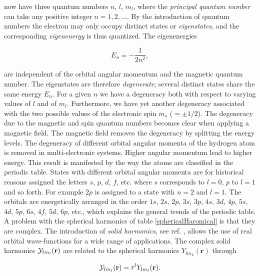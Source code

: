 now have three quantum numbers $n$, $l$, $m_l$, where the
\emph{principal quantum number} can take any positive integer
$n=1,2,\dots$. By the introduction of 
quantum numbers the electron may only occupy distinct states or
\emph{eigenstates}, and the corresponding \emph{eigenenergy} is thus
quantized. The eigenenergies

\begin{equation*}
  E_{n} = -\frac{1}{2n^2},
\end{equation*}

are independent of the orbital angular momentum and the magnetic
quantum number. The eigenstates are therefore \emph{degenerate};
several distinct states share the same energy $E_n$. For a given $n$
we have a degeneracy both with respect to varying values of $l$ and of
$m_l$. Furthermore, we have yet another degeneracy associated with the
two possible values of the electronic spin $m_s$ ($=\pm 1/2$).
\newline
%
\newline
The degeneracy due to the magnetic and spin quantum numbers becomes
clear when applying a magnetic field. The magnetic field removes the
degeneracy by splitting the energy levels. 
The degeneracy of different orbital angular momenta of the hydrogen
atom is removed in multi-electronic systems. 
Higher angular momentum lead to higher energy. 
This result 
is manifested by the way the atoms are classified in the periodic
table. States with different orbital angular momenta are for
historical reasons assigned the letters $s$, $p$, $d$, $f$, etc. where
$s$ corresponds to $l=0$, $p$ to $l=1$ and so forth. For example
$2p$ is assigned to a state with $n=2$ and $l=1$. The orbitals are
energetically arranged in the order $1s$, $2s$, $2p$, $3s$, $3p$,
$4s$, $3d$, $4p$, $5s$, $4d$, $5p$, $6s$, $4f$, $5d$, $6p$, etc.,
which explains the general trends of the periodic table.
\newline
%
\newline
A problem with the spherical harmonics of table
\ref{sphericalHaromical} is that they are complex. The introduction of
\emph{solid harmonics}, see ref. \cite{helgaker2002}, allows the use
of real orbital wave-functions for a wide range of applications. The
complex solid harmonics ${\cal Y}_{lm_l}(\mathbf{r})$ are related to
the spherical harmonics  $Y_{lm_L}(\mathbf{r})$ through

\begin{equation*}
  {\cal Y}_{lm_l}(\mathbf{r}) = r^l Y_{lm_l}(\mathbf{r}).
\end{equation*}

